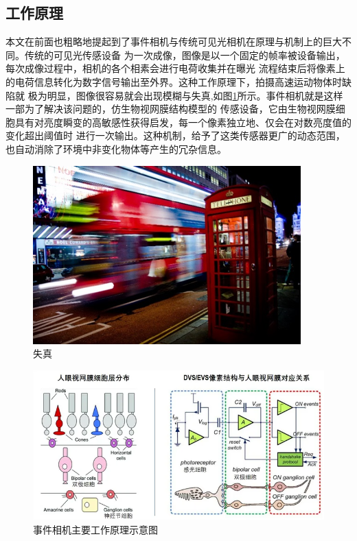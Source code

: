 \subsection{工作原理}
本文在前面也粗略地提起到了事件相机与传统可见光相机在原理与机制上的巨大不同。传统的可见光传感设备
为一次成像，图像是以一个固定的帧率被设备输出，每次成像过程中，相机的各个相素会进行电荷收集并在曝光
流程结束后将像素上的电荷信息转化为数字信号输出至外界。这种工作原理下，拍摄高速运动物体时缺陷就
极为明显，图像很容易就会出现模糊与失真,如图\ref{3}所示。事件相机就是这样一部为了解决该问题的，仿生物视网膜结构模型的
传感设备\cite{tayarani2021event}，它由生物视网膜细胞具有对亮度瞬变的高敏感性获得启发，每一个像素独立地、仅会在对数亮度值的变化超出阈值时
进行一次输出。这种机制，给予了这类传感器更广的动态范围，也自动消除了环境中非变化物体等产生的冗杂信息。
\begin{figure}
    \centering
    \includegraphics[width=\textwidth]{figures/motion_blur.png}
    \caption{失真}
    \label{3}
\end{figure}
\begin{figure}
    \centering
    \includegraphics[width=\textwidth]{figures/working_principle.png}
    \caption{事件相机主要工作原理示意图}
    \label{2}
\end{figure}

